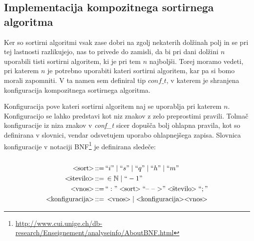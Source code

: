 \documentclass[a4paper,oneside]{article}
\def\N{\mathbb N}
\def\ali{\;|\;}
\newenvironment{BNF}{
    \\
    \Sbox
    \minipage{12cm}
}{
    \endminipage
    \endSbox
    \minipage{\textwidth}
    \vspace*{5pt}
    \begin{center}
        \fcolorbox{white}{white}{
            \TheSbox
        }
    \end{center}
    \vspace*{5pt}
    \endminipage
}
\def\bnfassign:{\,::=&\,}
\newcommand{\q}[1]{\text{``}#1\text{''}}
\newcommand{\ntm}[1]{\ensuremath{<\!\!\text{#1}\!\!>}}
\newcommand{\abnf}[2]{\ensuremath{\ntm{#1} \bnfassign: #2}}
\begin{document}
\subsection{Implementacija kompozitnega sortirnega algoritma}
\label{chapter:tweaksort}
Ker so sortirni algoritmi vsak zase dobri na zgolj nekaterih dolžinah polj in se pri tej
lastnosti razlikujejo, nas to privede do zamisli, da bi pri dani dolžini $n$ uporabili tisti
sortirni algoritem, ki je pri tem $n$ najboljši. Torej moramo vedeti, pri katerem $n$ je
potrebno uporabiti kateri sortirni algoritem, kar pa si bomo morali zapomniti. V ta
namen sem definiral tip $conf\_t$, v katerem je shranjena konfiguracija kompozitnega
sortirnega algoritma. 

Konfiguracija pove kateri sortirni algoritem naj se uporablja pri
katerem $n$. Konfiguracijo se lahko predstavi kot niz znakov z zelo preprostimi
pravili. Tolmač konfiguracije iz niza znakov v \emph{conf\_t} sicer dopušča bolj ohlapna pravila, kot so
definirana v slovnici, vendar odsvetujem uporabo ohlapnejšega zapisa.
Slovnica konfiguracije v notaciji
BNF\footnote{\url{http://www.cui.unige.ch/db-research/Enseignement/analyseinfo/AboutBNF.html}} 
je definirana sledeče: %
\\
\begin{BNF} %
  \begin{align*}
    \abnf{sort}{\q{i} \ali \q{s} \ali \q{q} \ali \q{h} \ali \q{m}}\\
    \abnf{število}{\in \N \ali \q{-1}} \\
    \abnf{vnos}{\q{:}\ntm{sort}\q{\mbox{--}\ \mbox{--}\ \mbox{$>$}}\ntm{število}\q{;}}\\
    \abnf{konfiguracija}{\ntm{vnos} | \ntm{konfiguracija}\ntm{vnos}}
  \end{align*}
\end{BNF}
\end{document}
